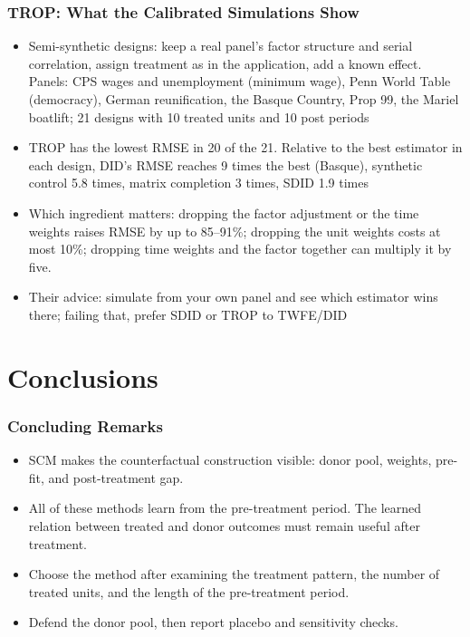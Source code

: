 \documentclass[xcolor=svgnames,9pt,english,t, aspectratio=169]{beamer}
\begin{document}
\begin{frame}
\frametitle{TROP: What the Calibrated Simulations Show}
\begin{itemize}\itemsep0.7em
  \item Semi-synthetic designs: keep a real panel's factor structure and serial correlation, assign treatment as in the application, add a known effect. Panels: CPS wages and unemployment (minimum wage), Penn World Table (democracy), German reunification, the Basque Country, Prop 99, the Mariel boatlift; 21 designs with 10 treated units and 10 post periods\pause
  \item TROP has the lowest RMSE in 20 of the 21. Relative to the best estimator in each design, DID's RMSE reaches 9 times the best (Basque), synthetic control 5.8 times, matrix completion 3 times, SDID 1.9 times\pause
  \item Which ingredient matters: dropping the factor adjustment or the time weights raises RMSE by up to 85--91\%; dropping the unit weights costs at most 10\%; dropping time weights and the factor together can multiply it by five. \pause
  \item Their advice: simulate from your own panel and see which estimator wins there; failing that, prefer SDID or TROP to TWFE/DID
\end{itemize}
\end{frame}
  


\section{Conclusions}


\begin{frame}
\frametitle{Concluding Remarks}
\begin{itemize}\itemsep0.8em
\item SCM makes the counterfactual construction visible: donor pool, weights, pre-fit, and post-treatment gap.\pause
\item All of these methods learn from the pre-treatment period. The learned relation between treated and donor outcomes must remain useful after treatment.\pause
\item Choose the method after examining the treatment pattern, the number of treated units, and the length of the pre-treatment period.\pause
\item Defend the donor pool, then report placebo and sensitivity checks.
\end{itemize}
\end{frame}
\end{document}

